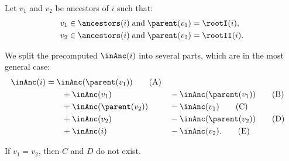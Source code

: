 Let $v_1$ and $v_2$ be ancestors of $i$ such that:
\begin{align*}
	v_1 \in \ancestors(i) &\booland \parent(v_1) = \rootI(i), \\
	v_2 \in \ancestors(i) &\booland \parent(v_2) = \rootII(i).
\end{align*}

We split the precomputed $\inAnc(i)$ into several parts, which are in the most general case:
\begin{alignat}{2}
	\inAnc(i) &= \inAnc(\parent(v_1)) \tag{A}\\
	&\qquad + \inAnc(v_1) &&- \inAnc(\parent(v_1)) \tag{B}\\
	&\qquad + \inAnc(\parent(v_2)) &&- \inAnc(v_1) \tag{C}\\
	&\qquad + \inAnc(v_2) &&- \inAnc(\parent(v_2)) \tag{D}\\
	&\qquad + \inAnc(i) &&- \inAnc(v_2). \tag{E}
\end{alignat}

If $v_1 = v_2$, then $C$ and $D$ do not exist.

